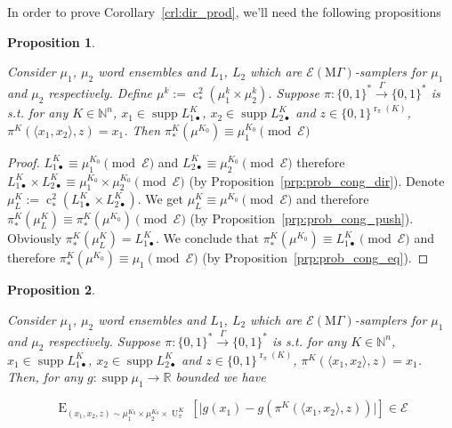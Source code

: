 \documentclass{article}
\numberwithin{equation}{section}
\theoremstyle{definition}
\theoremstyle{plain}
\newtheorem{proposition}{Proposition}[section]
\newcommand{\Bool}{\{0,1\}}
\newcommand{\Words}{{\Bool^*}}
\DeclareMathOperator{\Supp}{supp}
\DeclareMathOperator{\E}{E}
\DeclareMathOperator{\R}{r}
\DeclareMathOperator{\Un}{U}
\DeclareMathOperator{\En}{c}
\newcommand{\Nats}{\mathbb{N}}
\newcommand{\Reals}{\mathbb{R}}
\newcommand{\Abs}[1]{\lvert #1 \rvert}
\newcommand{\Chev}[1]{\langle #1 \rangle}
\newcommand{\MGrow}{\mathrm{M}\Gamma}
\newcommand{\Fall}{\mathcal{E}}
\newcommand{\EMG}{\Fall(\MGrow)}
\newcommand{\Scheme}{\xrightarrow{\Gamma}}
\begin{document}
In order to prove Corollary~\ref{crl:dir_prod}, we'll need the following propositions

\begin{samepage}
\begin{proposition}
\label{prp:thm__mult__cond1}

Consider $\mu_1$, $\mu_2$ word ensembles and $L_1$, $L_2$ which are $\EMG$-samplers for $\mu_1$ and $\mu_2$ respectively. Define ${\mu^k:=\En_*^2(\mu_1^k \times \mu_2^k)}$. Suppose $\pi: \Words \Scheme \Words$ is s.t. for any $K \in \Nats^n$, $x_1 \in \Supp L_{1\bullet}^{K}$, ${x_2 \in \Supp L_{2\bullet}^{K}}$ and $z \in \Bool^{\R_\pi(K)}$, $\pi^{K}(\Chev{x_1,x_2},z)=x_1$. Then $\pi_*^K(\mu^{K_0}) \equiv \mu_1^{K_0} \pmod \Fall$

\end{proposition}
\end{samepage}

\begin{proof}

$L_{1\bullet}^{K} \equiv \mu_1^{K_0} \pmod \Fall$ and $L_{2\bullet}^{K} \equiv \mu_2^{K_0} \pmod \Fall$ therefore ${L_{1\bullet}^{K} \times L_{2\bullet}^{K} \equiv \mu_1^{K_0} \times \mu_2^{K_0} \pmod \Fall}$ (by Proposition~\ref{prp:prob_cong_dir}). Denote $\mu_L^{K}:=\En_*^2(L_{1\bullet}^{K} \times L_{2\bullet}^{K})$. We get ${\mu_L^{K} \equiv \mu^{K_0} \pmod \Fall}$ and therefore $\pi_*^K(\mu_L^{K}) \equiv \pi_*^K(\mu^{K_0}) \pmod \Fall$ (by Proposition~\ref{prp:prob_cong_push}). Obviously $\pi_*^K(\mu_L^{K})=L_{1\bullet}^{K}$. We conclude that ${\pi_*^K(\mu^{K_0}) \equiv L_{1\bullet}^{K} \pmod \Fall}$ and therefore ${\pi_*^K(\mu^{K_0}) \equiv \mu_1 \pmod \Fall}$ (by Proposition~\ref{prp:prob_cong_eq}).
\end{proof}

\begin{samepage}
\begin{proposition}
\label{prp:thm__mult__cond2}

Consider $\mu_1$, $\mu_2$ word ensembles and $L_1$, $L_2$ which are $\EMG$-samplers for $\mu_1$ and $\mu_2$ respectively. Suppose $\pi: \Words \Scheme \Words$ is s.t. for any $K \in \Nats^n$, $x_1 \in \Supp L_{1\bullet}^{K}$, ${x_2 \in \Supp L_{2\bullet}^{K}}$ and $z \in \Bool^{\R_\pi(K)}$, $\pi^{K}(\Chev{x_1,x_2},z)=x_1$. Then, for any $g: \Supp \mu_1 \rightarrow \Reals$ bounded we have 

$$\E_{(x_1,x_2,z) \sim\mu_1^{K_0} \times \mu_2^{K_0} \times \Un_\pi^{K}}[\Abs{g(x_1)-g(\pi^{K}(\Chev{x_1,x_2},z))}] \in \Fall$$

\end{proposition}
\end{samepage}
\end{document}

